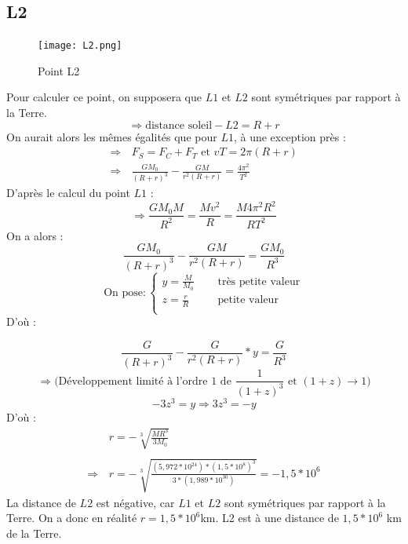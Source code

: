 \documentclass[12pt]{article}
\begin{document}
\subsection{L2}
\begin{figure}[H]
\centering
\texttt{[image: L2.png]}
\caption{Point L2}
\end{figure}
Pour calculer ce point, on supposera que $L1$ et $L2$ sont symétriques par rapport à la Terre. \\
$$\Rightarrow \text{distance soleil} - L2 = R+r$$
On aurait alors les mêmes égalités que pour $L1$, à une exception près : \\
\begin{align*}
\Rightarrow \, &F_{S} = F_{C} + F_{T} \text{ et } vT = 2\pi (R+r)\\
\Rightarrow \, &\boxed{\frac{GM_0}{(R+r)^3} - \frac{GM}{r^2 (R+r)} = \frac{4\pi ^2}{T^2}} \tag{1}
\end{align*}
D'après le calcul du point $L1$ : \\
\begin{equation*}
\Rightarrow \boxed{\frac{GM_{0}M}{R^2} = \frac{Mv^2}{R} = \frac{M4\pi ^2R^2}{RT^2}} \tag{2}
\end{equation*}
On a alors : \\
$$ \frac{GM_0}{(R+r)^3} - \frac{GM}{r^2(R+r)} = \frac{GM_0}{R^3}$$
\[ \text{On pose} : 
\begin{cases}
y = \frac{M}{M_0}  & \quad \text{ très petite valeur}\\
z = \frac{r}{R}  & \quad \text{ petite valeur}\\
\end{cases}
\] 
D'où : 

$$\frac{G}{(R+r)^3} - \frac{G}{r^2(R+r)} *y = \frac{G}{R^3}$$
$$\Rightarrow \text{(Développement limité à l'ordre 1 de }\frac{1}{(1+z)^3} \text{ et } (1+z) \rightarrow 1) $$
$$-3z^3 = y \Rightarrow \boxed{3z^3 = -y}$$
D'où : 
\begin{align*}
&\boxed{r= - \sqrt[3]{\frac{MR^3}{3M_0}}} \\ \\
\Rightarrow \, &\boxed{r =- \sqrt[3]{\frac{(5,972*10^{24})*(1,5*10^8)^3}{3*(1,989*10^{30})}} = -1,5*10^{6}}
\end{align*}
La distance de $L2$ est négative, car $L1$ et $L2$ sont symétriques par rapport à la Terre.
On a donc en réalité $r = 1,5*10^6 $km. L2 est à une distance de $1,5*10^6$ km de la Terre.
\end{document}
